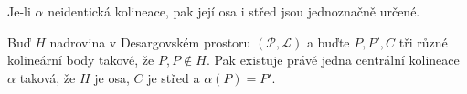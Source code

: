 \begin{consequence}
    Je-li $\alpha$ neidentická kolineace, pak její osa i střed jsou jednoznačně určené.
\end{consequence}
\begin{theorem}[Baerova]
    Buď $H$ nadrovina v Desargovském prostoru $(\mathcal{P},\mathcal{L})$ a buďte $P,P', C$ tři různé kolineární body takové, že $P,P\not\in H$.
    Pak existuje právě jedna centrální kolineace $\alpha$ taková, že $H$ je osa, $C$ je střed a $\alpha(P)=P'$.
\end{theorem}
